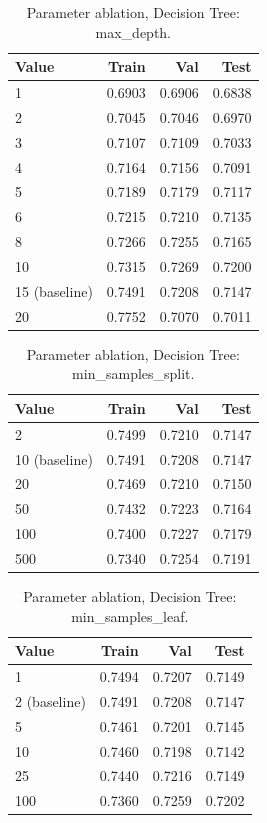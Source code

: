 
\begin{table}[ht]
\centering
\small
\caption{Parameter ablation, Decision Tree: max\_depth.}
\label{tab:ablation-tree-max-depth}
\begin{tabular}{lrrr}
\toprule
Value & Train & Val & Test \\
\midrule
1 & 0.6903 & 0.6906 & 0.6838 \\
2 & 0.7045 & 0.7046 & 0.6970 \\
3 & 0.7107 & 0.7109 & 0.7033 \\
4 & 0.7164 & 0.7156 & 0.7091 \\
5 & 0.7189 & 0.7179 & 0.7117 \\
6 & 0.7215 & 0.7210 & 0.7135 \\
8 & 0.7266 & 0.7255 & 0.7165 \\
10 & 0.7315 & 0.7269 & 0.7200 \\
15 (baseline) & 0.7491 & 0.7208 & 0.7147 \\
20 & 0.7752 & 0.7070 & 0.7011 \\
\bottomrule
\end{tabular}
\end{table}

\begin{table}[ht]
\centering
\small
\caption{Parameter ablation, Decision Tree: min\_samples\_split.}
\label{tab:ablation-tree-min-samples-split}
\begin{tabular}{lrrr}
\toprule
Value & Train & Val & Test \\
\midrule
2 & 0.7499 & 0.7210 & 0.7147 \\
10 (baseline) & 0.7491 & 0.7208 & 0.7147 \\
20 & 0.7469 & 0.7210 & 0.7150 \\
50 & 0.7432 & 0.7223 & 0.7164 \\
100 & 0.7400 & 0.7227 & 0.7179 \\
500 & 0.7340 & 0.7254 & 0.7191 \\
\bottomrule
\end{tabular}
\end{table}

\begin{table}[ht]
\centering
\small
\caption{Parameter ablation, Decision Tree: min\_samples\_leaf.}
\label{tab:ablation-tree-min-samples-leaf}
\begin{tabular}{lrrr}
\toprule
Value & Train & Val & Test \\
\midrule
1 & 0.7494 & 0.7207 & 0.7149 \\
2 (baseline) & 0.7491 & 0.7208 & 0.7147 \\
5 & 0.7461 & 0.7201 & 0.7145 \\
10 & 0.7460 & 0.7198 & 0.7142 \\
25 & 0.7440 & 0.7216 & 0.7149 \\
100 & 0.7360 & 0.7259 & 0.7202 \\
\bottomrule
\end{tabular}
\end{table}

